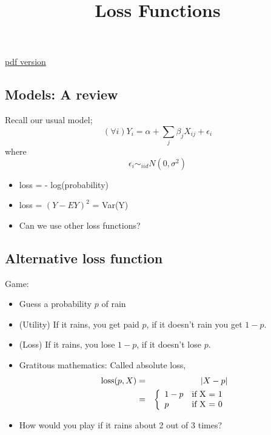 \documentclass[12pt]{extarticle} %
\begin{document}
\title{Loss Functions}
\maketitle
\href{class_loss_functions.pdf}{pdf version}
\subsection*{Models: A review}
Recall our usual model;
\begin{displaymath}
(\forall i) Y_i = \alpha + \sum_j \beta_j X_{ij} + \epsilon_i
\end{displaymath}
where
\begin{displaymath}
\epsilon_i \sim_{iid} N(0,\sigma^2)
\end{displaymath}
\begin{itemize}
\item loss = - log(probability)
\item loss = $(Y -EY)^2$ = Var(Y)
\item Can we use other loss functions?
\end{itemize}

\subsection*{Alternative loss function}

Game:
\begin{itemize}
\item Guess a probability $p$ of rain
\item (Utility) If it rains, you get paid $p$, if it doesn't rain you get $1-p$.
\item (Loss) If it rains, you lose $1-p$, if it doesn't lose $p$.
\item Gratitous mathematics: Called absolute loss,
\begin{eqnarray*}
\hbox{loss}(p,X) &= &|X - p|\\
&= &\left\{\begin{array}{l@{\quad}l}1-p &
\hbox{if X = 1}\\ p & \hbox{if X = 0}
\end{array}
\right.
\end{eqnarray*}
\item How would you play if it rains about 2 out of 3 times?
\end{itemize}
\end{document}
